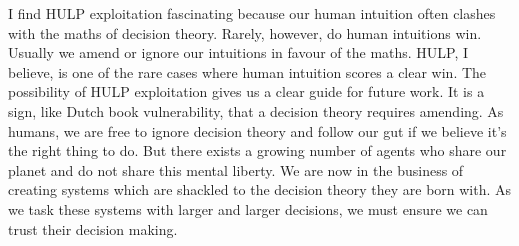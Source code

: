 \documentclass{article}
\begin{document}
I find HULP exploitation fascinating because our human intuition often clashes with the maths of decision theory. Rarely, however, do human intuitions win. Usually we amend or ignore our intuitions in favour of the maths. HULP, I believe, is one of the rare cases where human intuition scores a clear win. The possibility of HULP exploitation gives us a clear guide for future work. It is a sign, like Dutch book vulnerability, that a decision theory requires amending. As humans, we are free to ignore decision theory and follow our gut if we believe it's the right thing to do. But there exists a growing number of agents who share our planet and do not share this mental liberty. We are now in the business of creating systems which are shackled to the decision theory they are born with. As we task these systems with larger and larger decisions, we must ensure we can trust their decision making.





\end{document}

